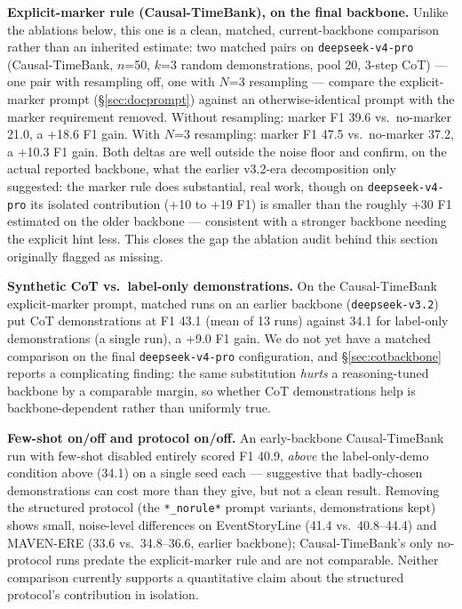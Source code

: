 \documentclass[11pt]{article}
\begin{document}
\textbf{Explicit-marker rule (Causal-TimeBank), on the final backbone.} Unlike the
ablations below, this one is a clean, matched, current-backbone comparison rather
than an inherited estimate: two matched pairs on \texttt{deepseek-v4-pro}
(Causal-TimeBank, $n$=50, $k$=3 random demonstrations, pool 20, 3-step CoT) ---
one pair with resampling off, one with $N$=3 resampling --- compare the
explicit-marker prompt (\S\ref{sec:docprompt}) against an otherwise-identical
prompt with the marker requirement removed. Without resampling: marker F1 39.6
vs.\ no-marker 21.0, a +18.6 F1 gain. With $N$=3 resampling: marker F1 47.5 vs.\
no-marker 37.2, a +10.3 F1 gain. Both deltas are well outside the noise floor and
confirm, on the actual reported backbone, what the earlier v3.2-era decomposition
only suggested: the marker rule does substantial, real work, though on
\texttt{deepseek-v4-pro} its isolated contribution (+10 to +19 F1) is smaller than
the roughly +30 F1 estimated on the older backbone --- consistent with a stronger
backbone needing the explicit hint less. This closes the gap the ablation audit
behind this section originally flagged as missing.

\textbf{Synthetic CoT vs.\ label-only demonstrations.} On the Causal-TimeBank
explicit-marker prompt, matched runs on an earlier backbone (\texttt{deepseek-v3.2})
put CoT demonstrations at F1 43.1 (mean of 13 runs) against 34.1 for label-only
demonstrations (a single run), a +9.0 F1 gain. We do not yet have a matched
comparison on the final \texttt{deepseek-v4-pro} configuration, and
\S\ref{sec:cotbackbone} reports a complicating finding: the same substitution
\emph{hurts} a reasoning-tuned backbone by a comparable margin, so whether CoT
demonstrations help is backbone-dependent rather than uniformly true.

\textbf{Few-shot on/off and protocol on/off.} An early-backbone Causal-TimeBank run
with few-shot disabled entirely scored F1 40.9, \emph{above} the label-only-demo
condition above (34.1) on a single seed each --- suggestive that badly-chosen
demonstrations can cost more than they give, but not a clean result. Removing the
structured protocol (the \texttt{*\_norule*} prompt variants, demonstrations kept)
shows small, noise-level differences on EventStoryLine (41.4 vs.\ 40.8--44.4) and
MAVEN-ERE (33.6 vs.\ 34.8--36.6, earlier backbone); Causal-TimeBank's only
no-protocol runs predate the explicit-marker rule and are not comparable. Neither
comparison currently supports a quantitative claim about the structured protocol's
contribution in isolation.
\end{document}
